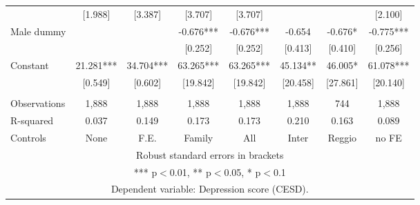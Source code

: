 \begin{tabular}{lccccccc}
 & [1.988] & [3.387] & [3.707] & [3.707] &  &  & [2.100] \\
Male dummy &  &  & -0.676*** & -0.676*** & -0.654 & -0.676* & -0.775*** \\
 &  &  & [0.252] & [0.252] & [0.413] & [0.410] & [0.256] \\
Constant & 21.281*** & 34.704*** & 63.265*** & 63.265*** & 45.134** & 46.005* & 61.078*** \\
 & [0.549] & [0.602] & [19.842] & [19.842] & [20.458] & [27.861] & [20.140] \\
 &  &  &  &  &  &  &  \\
Observations & 1,888 & 1,888 & 1,888 & 1,888 & 1,888 & 744 & 1,888 \\
R-squared & 0.037 & 0.149 & 0.173 & 0.173 & 0.210 & 0.163 & 0.089 \\
 Controls & None & F.E. & Family & All & Inter & Reggio & no FE \\ \hline
\multicolumn{8}{c}{ Robust standard errors in brackets} \\
\multicolumn{8}{c}{ *** p$<$0.01, ** p$<$0.05, * p$<$0.1} \\
\multicolumn{8}{c}{ Dependent variable: Depression score (CESD).} \\
\end{tabular}
